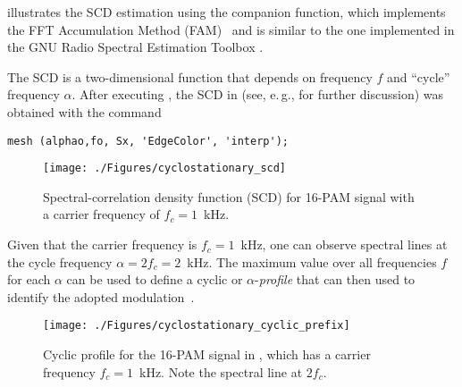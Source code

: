  illustrates the SCD estimation using the companion  function, which implements the FFT Accumulation Method (FAM)~\cite{Roberts91} and is similar to the one implemented in the GNU Radio Spectral Estimation Toolbox  .




The SCD is a two-dimensional function that depends on frequency $f$ and ``cycle'' frequency $\alpha$. 
After executing , the SCD in  (see, e.\,g., \cite{Gardner91} for further discussion) was obtained with the command
\begin{lstlisting}
mesh (alphao,fo, Sx, 'EdgeColor', 'interp');
\end{lstlisting}

\begin{figure}
\centering
\texttt{[image: ./Figures/cyclostationary\_scd]}
\caption{Spectral-correlation density function (SCD) for 16-PAM signal with a carrier frequency of $f_c=1$~kHz.\label{fig:cyclostationary_scd}}
\end{figure}

Given that 
the carrier frequency is $f_c=1$~kHz, one can observe spectral lines at the cycle frequency $\alpha=2 f_c=2$~kHz.
The maximum value over all frequencies $f$ for each $\alpha$ can be used to define a cyclic or $\alpha$-\emph{profile} that can then used to identify the adopted modulation~\cite{Reed05}.

\begin{figure}
\centering
\texttt{[image: ./Figures/cyclostationary\_cyclic\_prefix]}
\caption{Cyclic profile for the 16-PAM signal in , which has a carrier frequency $f_c=1$~kHz. Note the spectral line at $2 f_c$.\label{fig:cyclostationary_cyclic_prefix}}
\end{figure}

